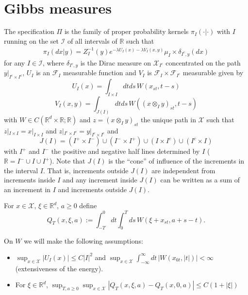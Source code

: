 \documentclass[a4paper,12pt,reqno]{amsart}
\newcommand{\R}{\mathbb{R}}
\newcommand{\I}{\mathcal{I}}
\newcommand{\X}{\mathcal{X}}
\newcommand{\F}{\mathcal{F}}
\begin{document}
\section{Gibbs measures}
\label{sec:existence}
The specification $\Pi$ is the family of proper probability kernels
$\pi_I(\cdot|\cdot)$ with $I$ running on the set $\I$ of all intervals of $\R$ such
that
\begin{equation}
  \begin{split}
\pi_I(dx|y) = Z_{I}^{-1}(y) e^{-\lambda U_{I}(x) -\lambda V_{I}(x,y)} \mu_I\times \delta_{I^c,y}(dx)   
  \end{split}
\end{equation}
for any $I \in \I$,
where $\delta_{I^c,y}$ is the Dirac measure on $\X_{I^c}$
concentrated on the path $y|_{I^c\times I^c}$, $U_I$ is an $\F_I$
measurable function and $V_I$ is $\F_I \times \F_{I^c}$ measurable
given by
\begin{equation}
U_I(x) = \int_{I\times I} dt  ds \, W(x_{st},t-s)  
\end{equation}
\begin{equation}
V_I(x,y) = \int_{J(I)} dt ds \, W((x \otimes_I y)_{st},t-s)  
\end{equation}
with $W \in C(\R^d\times \R ; \R)$ and $z = (x \otimes_I y)_{st}$ the
  unique path in $\X$ such that $z|_{I\times
  I} = x |_{I\times  I}$ and $z|_{I^c\times
  I^c} = y |_{I^c\times  I^c}$ and
$$
J(I) = (I^+ \times I^-) \cup (I^- \times I^+) \cup (I \times I^c) \cup (I^c \times I)
$$
with $I^+$ and $I^-$ the positive and negative half lines determined by
$I$ ($\R = I^- \cup I \cup I^+$). Note that $J(I)$ is the ``cone'' of
influence of the increments in the interval $I$. That is, increments
outside $J(I)$ are independent from increments inside $I$ and any
increment inside $J(I)$ can be written as a sum of an increment in $I$
and increments outside $J(I)$.
 
For $x \in \X$, $\xi \in \R^d$, $a \ge 0$ define
$$
Q_T(x,\xi,a) := \int_{-T}^0 dt \int_{0}^T ds \, W(\xi+x_{st},a+s-t).
$$

On $W$ we will make the following assumptions:
\begin{itemize}
\item[H1)] $\sup_{x \in \X} |U_I(x)| \le C |I|^2$ and
$
\sup_{x \in \X}\int_{-\infty}^\infty dt \, |W(x_{0t},|t|)| < \infty
$ (extensiveness of the energy).
\item[H2)]
For $\xi\in \R^d$,
$
\sup_{T,a \ge 0} \sup_{x \in \X}|Q_T(x,\xi,a)-Q_T(x,0,a)| \le C  (1+|\xi|)
$
\end{itemize}  
\end{document}
